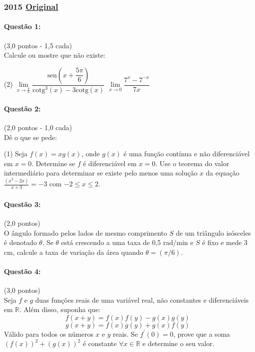 \documentclass[12pt,a4paper]{article}
\newcommand{\R}{\mathbb{R}}
\newcommand{\original}[1]{\tiny \href{#1}{Original} \normalsize}
\begin{document}
\subsubsection{2015 \original{https://drive.google.com/file/d/1vmdYSMDPtf2bYDcNAfgM1HinpLRuzqn_/view?usp=sharing}}


\paragraph{Questão 1: }(3,0 pontos - 1,5 cada)\\
Calcule ou mostre que não existe:
\begin{tasks}(2)
\task $\lim\limits_{x\to \frac{\pi}{6}} \dfrac{\mathrm{sen}\left(x+\dfrac{5\pi}{6}\right)}{\mathrm{cotg}^3(x) - 3\mathrm{cotg}(x)}$
\task $\lim\limits_{x\to 0} \dfrac{7^x - 7^{-x}}{7x}$
\end{tasks}

\paragraph{Questão 2: }(2,0 pontos - 1,0 cada)\\
Dê o que se pede:
\begin{tasks}(1)
\task Seja $f(x) = xg(x)$, onde $g(x)$ é uma função contínua e não diferenciável em $x=0$. Determine se $f$ é diferenciável em $x=0$.
\task Use o teorema do valor intermediário para determinar se existe pelo menos uma solução $x$ da equação $\frac{(x^3 - 2x)}{x+3} = -3$ com $-2\le x \le 2$.
\end{tasks}

\paragraph{Questão 3: }(2,0 pontos)\\
O ângulo formado pelos lados de mesmo comprimento $S$ de um triângulo isósceles é denotado $\theta$. Se $\theta$ está crescendo a uma taxa de 0,5 rad/min e $S$ é fixo e mede 3 cm, calcule a taxa de variação da área quando $\theta = (\pi/6)$\textdegree.

\paragraph{Questão 4: }(3,0 pontos)\\
Seja $f$ e $g$ duas funções reais de uma variável real, não constantes e diferenciáveis em $\R$. Além disso, suponha que:
$$f(x+y) = f(x)f(y) - g(x)g(y)$$
$$g(x+y) = f(x)g(y) + g(x)f(y)$$
Válido para todos os números $x$ e $y$ reais.
Se $f^{\prime}(0) = 0$, prove que a soma $\left(f(x)\right)^2 + \left(g(x)\right)^2$ é constante $\forall x \in \R$ e determine o seu valor.
\end{document}
